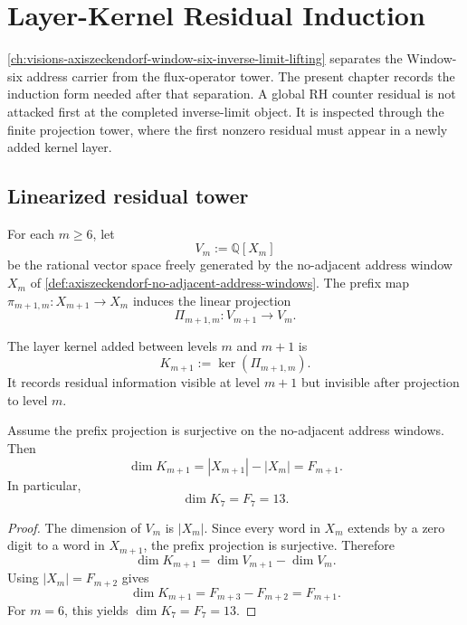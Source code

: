 \chapter{Layer-Kernel Residual Induction}
\label{ch:visions-axiszeckendorf-layer-kernel-residual-induction}

\autoref{ch:visions-axiszeckendorf-window-six-inverse-limit-lifting}
separates the Window-six address carrier from the flux-operator tower.  The
present chapter records the induction form needed after that separation.  A
global RH counter residual is not attacked first at the completed
inverse-limit object.  It is inspected through the finite projection tower,
where the first nonzero residual must appear in a newly added kernel layer.

\section{Linearized residual tower}
\label{sec:axiszeckendorf-linearized-residual-tower}

\begin{definition}
\label{def:axiszeckendorf-linearized-address-residual-space}
For each $m\geq 6$, let
$$
V_m:=\mathbb Q[X_m]
$$
be the rational vector space freely generated by the no-adjacent address
window $X_m$ of
\autoref{def:axiszeckendorf-no-adjacent-address-windows}.  The prefix map
$\pi_{m+1,m}:X_{m+1}\to X_m$ induces the linear projection
$$
\Pi_{m+1,m}:V_{m+1}\to V_m.
$$
\end{definition}

\begin{definition}
\label{def:axiszeckendorf-layer-kernel}
The layer kernel added between levels $m$ and $m+1$ is
$$
K_{m+1}:=\ker(\Pi_{m+1,m}).
$$
It records residual information visible at level $m+1$ but invisible after
projection to level $m$.
\end{definition}

\begin{proposition}
\label{prop:axiszeckendorf-layer-kernel-dimension}
Assume the prefix projection is surjective on the no-adjacent address
windows.  Then
$$
\dim K_{m+1}=|X_{m+1}|-|X_m|=F_{m+1}.
$$
In particular,
$$
\dim K_7=F_7=13.
$$
\end{proposition}

\begin{proof}
The dimension of $V_m$ is $|X_m|$.  Since every word in $X_m$ extends by a
zero digit to a word in $X_{m+1}$, the prefix projection is surjective.
Therefore
$$
\dim K_{m+1}=\dim V_{m+1}-\dim V_m.
$$
Using $|X_m|=F_{m+2}$ gives
$$
\dim K_{m+1}=F_{m+3}-F_{m+2}=F_{m+1}.
$$
For $m=6$, this yields $\dim K_7=F_7=13$.
\end{proof}

